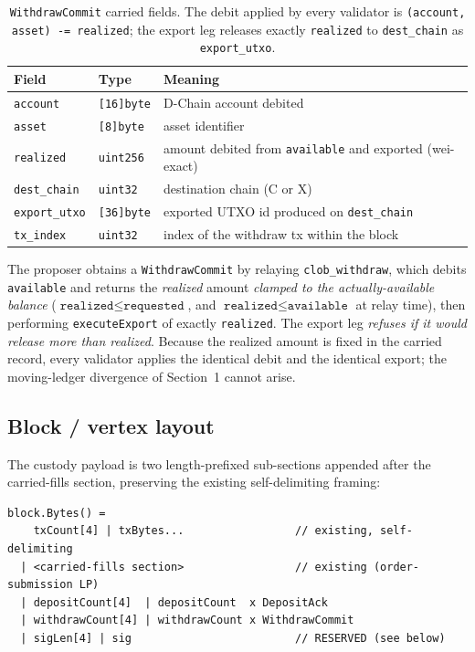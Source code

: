 \begin{table}[h]
\centering
\small
\begin{tabular}{@{}lll@{}}
\toprule
\textbf{Field} & \textbf{Type} & \textbf{Meaning} \\
\midrule
\texttt{account}       & \texttt{[16]byte} & D-Chain account debited \\
\texttt{asset}         & \texttt{[8]byte}  & asset identifier \\
\texttt{realized}      & \texttt{uint256}  & amount debited from \texttt{available}
                                            and exported (wei-exact) \\
\texttt{dest\_chain}   & \texttt{uint32}   & destination chain (C or X) \\
\texttt{export\_utxo}  & \texttt{[36]byte} & exported UTXO id produced on \texttt{dest\_chain} \\
\texttt{tx\_index}     & \texttt{uint32}   & index of the withdraw tx within the block \\
\bottomrule
\end{tabular}
\caption{\texttt{WithdrawCommit} carried fields. The debit applied by
every validator is \texttt{(account, asset) -= realized}; the export
leg releases exactly \texttt{realized} to \texttt{dest\_chain} as
\texttt{export\_utxo}.}
\label{tab:withdrawcommit}
\end{table}

The proposer obtains a \texttt{WithdrawCommit} by relaying
\texttt{clob\_withdraw}, which debits \texttt{available} and returns the
\emph{realized} amount \emph{clamped to the actually-available balance}
($\texttt{realized} \le \texttt{requested}$, and $\texttt{realized} \le
\texttt{available}$ at relay time), then performing
\texttt{executeExport} of exactly \texttt{realized}. The export leg
\emph{refuses if it would release more than realized}. Because the
realized amount is fixed in the carried record, every validator applies
the identical debit and the identical export; the moving-ledger
divergence of Section~1 cannot arise.

\subsection{Block / vertex layout}

The custody payload is two length-prefixed sub-sections appended after
the carried-fills section, preserving the existing self-delimiting
framing:

\begin{lstlisting}
block.Bytes() =
    txCount[4] | txBytes...                 // existing, self-delimiting
  | <carried-fills section>                 // existing (order-submission LP)
  | depositCount[4]  | depositCount  x DepositAck
  | withdrawCount[4] | withdrawCount x WithdrawCommit
  | sigLen[4] | sig                         // RESERVED (see below)
\end{lstlisting}

